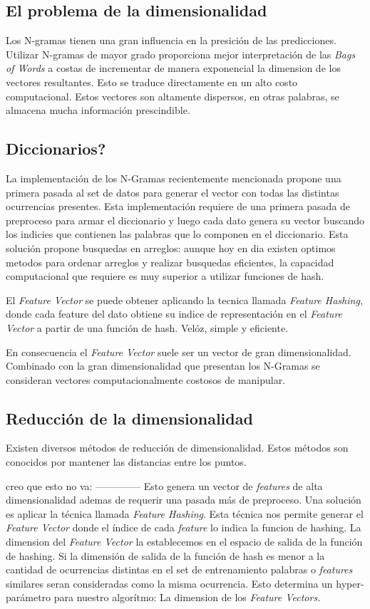 \documentclass[a4paper,10pt]{article}
\begin{document}
	\subsection{El problema de la dimensionalidad}
	Los N-gramas tienen una gran influencia en la presición de las predicciones. Utilizar N-gramas de mayor grado proporciona mejor interpretación de las \textit{Bags of Words} a costas de incrementar de manera exponencial la dimension de los vectores resultantes. Esto se traduce directamente en un alto costo computacional. Estos vectores son altamente dispersos, en otras palabras, se almacena mucha información prescindible.
	
	\subsection{Diccionarios?}
	La implementación de los N-Gramas recientemente mencionada propone una primera pasada al set de datos para generar el vector con todas las distintas ocurrencias presentes. Esta implementación requiere de una primera pasada de preproceso para armar el diccionario y luego cada dato genera su vector buscando los indicies que contienen las palabras que lo componen en el diccionario. Esta solución propone busquedas en arreglos: aunque hoy en dia existen optimos metodos para ordenar arreglos y realizar busquedas eficientes, la capacidad computacional que requiere es muy superior a utilizar funciones de hash.
	
	El \textit{Feature Vector} se puede obtener aplicando la tecnica llamada \textit{Feature Hashing}, donde cada feature del dato obtiene su indice de representación en el \textit{Feature Vector} a partir de una función de hash. Velóz, simple y eficiente.
	
	En consecuencia el \textit{Feature Vector} suele ser un vector de gran dimensionalidad. Combinado con la gran dimensionalidad que presentan los N-Gramas se consideran vectores computacionalmente costosos de manipular.
	
	\subsection{Reducción de la dimensionalidad}
	
	Existen diversos métodos de reducción de dimensionalidad. Estos métodos son conocidos por mantener las distancias entre los puntos.
	
	creo que esto no va: --------------
	Esto genera un vector de \textit{features} de alta dimensionalidad ademas de requerir una pasada más de preproceso. Una solución es aplicar la técnica llamada \textit{Feature Hashing}. Esta técnica nos permite generar el \textit{Feature Vector} donde el índice de cada \textit{feature} lo indica la funcion de hashing. La dimension del \textit{Feature Vector} la establecemos en el espacio de salida de la función de hashing. Si la dimensión de salida de la función de hash es menor a la cantidad de ocurrencias distintas en el set de entrenamiento palabras o \textit{features} similares seran consideradas como la misma ocurrencia. Esto determina un hyper-parámetro para nuestro algorítmo: La dimension de los \textit{Feature Vectors.}
	
\end{document}
